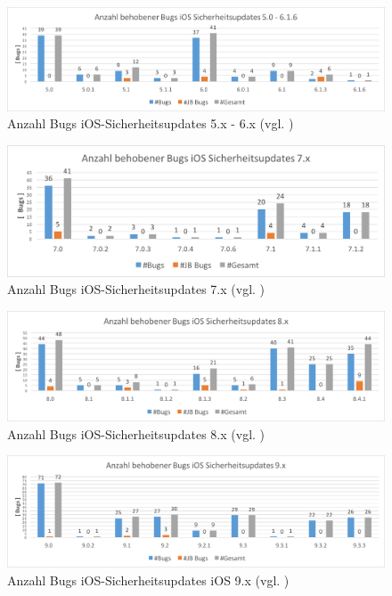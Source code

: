\newpage
\begin{figure}[htbp!]
        \centering
                \includegraphics[scale=0.5]{Bilder/iOSSicherheitsupdate5.png}
        \caption{Anzahl Bugs iOS-Sicherheitsupdates 5.x - 6.x (vgl. \cite{Apple[7]}) \protect\footnotemark}
        \label{fig:AnalyseiOSSicherheitsupdate5}
\end{figure}
\begin{figure}[htbp!]
        \centering
                \includegraphics[scale=0.7]{Bilder/iOSSicherheitsupdate7.png}
        \caption{Anzahl Bugs iOS-Sicherheitsupdates 7.x (vgl. \cite{Apple[7]}) \protect\footnotemark}
        \label{fig:AnalyseiOSSicherheitsupdate7}
\end{figure}
\begin{figure}[htbp!]
        \centering
                \includegraphics[scale=0.54]{Bilder/iOSSicherheitsupdate8.png}
        \caption{Anzahl Bugs iOS-Sicherheitsupdates 8.x (vgl. \cite{Apple[7]}) \protect\footnotemark}
        \label{fig:AnalyseiOSSicherheitsupdate8}
\end{figure}

\newpage
\begin{figure}[ht!]
        \centering
                \includegraphics[scale=0.55]{Bilder/iOSSicherheitsupdate9.png}
        \caption{Anzahl Bugs iOS-Sicherheitsupdates iOS 9.x (vgl. \cite{Apple[7]}) \protect\footnotemark}
        \label{fig:AnalyseiOSSicherheitsupdate9}
\end{figure}


